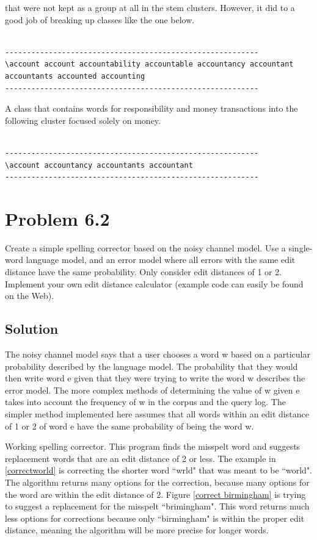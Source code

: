 \documentclass[letterpaper,12pt]{article}
\begin{document}
that were not kept as a group at all in the stem clusters. However, it did to a good job of breaking up classes like the one below.

\begin{lstlisting}[breaklines]

----------------------------------------------------------
\account account accountability accountable accountancy accountant accountants accounted accounting 
----------------------------------------------------------
\end{lstlisting}
A class that contains words for responsibility and money transactions into the following cluster focused solely on money.
\begin{lstlisting}[breaklines]

----------------------------------------------------------
\account accountancy accountants accountant 
----------------------------------------------------------
\end{lstlisting}

\pagebreak

\section{Problem 6.2}

Create a simple spelling corrector based on the noisy channel model. Use a single-word language model, and an error model where all errors with the same edit distance have the same probability. Only consider edit distances of 1 or 2. Implement your own edit distance calculator (example code can easily be found on the Web).

\subsection{Solution}

The noisy channel model says that a user chooses a word w based on a particular probability described by the language model. The probability that they would then write word e  given that they were trying to write the word w describes the error model. The more complex methods of determining the value of w given e takes into account the frequency of w in the corpus and the query log. The simpler method implemented here assumes that all words within an edit distance of 1 or 2 of word e have the same probability of being the word w.

Working spelling corrector. This program finds the misspelt word and suggests replacement words that are an edit distance of 2 or less. The example in \ref{correctworld} is correcting the shorter word ``wrld" that was meant to be ``world". The algorithm returns many options for the correction, because many options for the word are within the edit distance of 2. Figure \ref{correct birmingham} is trying to suggest a replacement for the misspelt ``brimingham". This word returns much less options for corrections because only ``birmingham" is within the proper edit distance, meaning the algorithm will be more precise for longer words.
\end{document}
